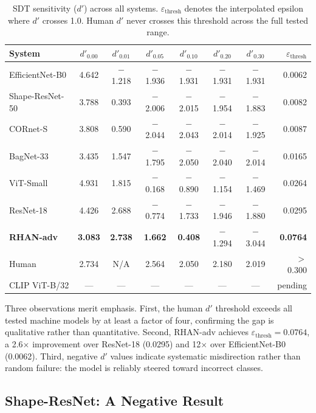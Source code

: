 \documentclass[12pt,a4paper]{article}
\begin{document}
\begin{table}[H]
\centering
\caption{SDT sensitivity ($d'$) across all systems.
$\varepsilon_{\text{thresh}}$ denotes the interpolated epsilon where
$d'$ crosses 1.0. Human $d'$ never crosses this threshold across
the full tested range.}
\label{tab:sdt}
\renewcommand{\arraystretch}{1.3}
\begin{tabularx}{\textwidth}{lCCCCCCr}
\toprule
\textbf{System} &
\boldmath$d'_{0.00}$ & \boldmath$d'_{0.01}$ & \boldmath$d'_{0.05}$ &
\boldmath$d'_{0.10}$ & \boldmath$d'_{0.20}$ & \boldmath$d'_{0.30}$ &
\boldmath$\varepsilon_{\text{thresh}}$ \\
\midrule
EfficientNet-B0  & 4.642 & $-$1.218 & $-$1.936 & $-$1.931 & $-$1.931 & $-$1.931 & 0.0062 \\
Shape-ResNet-50  & 3.788 &    0.393 & $-$2.006 & $-$2.015 & $-$1.954 & $-$1.883 & 0.0082 \\
CORnet-S         & 3.808 &    0.590 & $-$2.044 & $-$2.043 & $-$2.014 & $-$1.925 & 0.0087 \\
BagNet-33        & 3.435 &    1.547 & $-$1.795 & $-$2.050 & $-$2.040 & $-$2.014 & 0.0165 \\
ViT-Small        & 4.931 &    1.815 & $-$0.168 & $-$0.890 & $-$1.154 & $-$1.469 & 0.0264 \\
ResNet-18        & 4.426 &    2.688 & $-$0.774 & $-$1.733 & $-$1.946 & $-$1.880 & 0.0295 \\
\midrule
\textbf{RHAN-adv} & \textbf{3.083} & \textbf{2.738} & \textbf{1.662} &
                    \textbf{0.408} & $-$1.294 & $-$3.044 & \textbf{0.0764} \\
\midrule
Human            & 2.734 & N/A   & 2.564 & 2.050 & 2.180 & 2.019 & $>$0.300 \\
CLIP ViT-B/32    & ---   & ---   & ---   & ---   & ---   & ---   & pending  \\
\bottomrule
\end{tabularx}
\end{table}

Three observations merit emphasis.
First, the human $d'$ threshold exceeds all tested machine models by at
least a factor of four, confirming the gap is qualitative rather than
quantitative.
Second, RHAN-adv achieves $\varepsilon_{\text{thresh}}{=}0.0764$,
a 2.6$\times$ improvement over ResNet-18 (0.0295) and
12$\times$ over EfficientNet-B0 (0.0062).
Third, negative $d'$ values indicate systematic misdirection rather than
random failure: the model is reliably steered toward incorrect classes.

\subsection{Shape-ResNet: A Negative Result}
\end{document}
